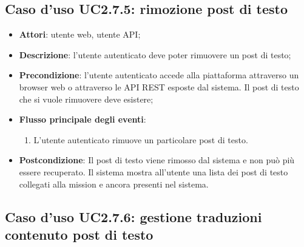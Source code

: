 \subsection{Caso d'uso UC2.7.5: rimozione post di testo}
\begin{itemize}
\item \textbf{Attori}: utente web, utente API;
\item \textbf{Descrizione}: l'utente autenticato deve poter rimuovere un post di testo; 
      \item \textbf{Precondizione}: l'utente autenticato accede alla piattaforma attraverso un browser web o attraverso le API REST esposte dal sistema. Il post di testo che si vuole rimuovere deve esistere;

        \item \textbf{Flusso principale degli eventi}:
          \begin{enumerate}
          \item L'utente autenticato rimuove un particolare post di testo.

      \end{enumerate}
    \item \textbf{Postcondizione}: Il post di testo viene rimosso dal sistema e non può più essere recuperato. Il sistema mostra all'utente una lista dei post di testo collegati alla mission e ancora presenti nel sistema.
  \end{itemize}
\hypertarget{UC2.7.6}{}
\subsection{Caso d'uso UC2.7.6: gestione traduzioni contenuto post di testo}

